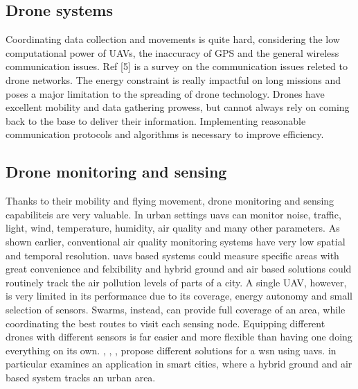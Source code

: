 \subsection{Drone systems}
Coordinating data collection and movements is quite hard, considering the low computational power of UAVs, the inaccuracy of GPS and the general wireless communication issues. Ref [5] is a survey on the communication issues releted to drone networks. The energy constraint is really impactful on long missions and poses a major limitation to the spreading of drone technology. Drones have excellent mobility and data gathering prowess, but cannot always rely on coming back to the base to deliver their information. Implementing reasonable communication protocols and algorithms is necessary to improve efficiency. 
\subsection{Drone monitoring and sensing}
Thanks to their mobility and flying movement, drone monitoring and sensing capabiliteis are very valuable. In urban settings \gls{uavs} can monitor noise, traffic, light, wind, temperature, humidity, air quality and many other parameters.
As shown earlier, conventional air quality monitoring systems have very low spatial and temporal resolution. \gls{uavs} based systems could measure specific areas with great convenience and felxibility and hybrid ground and air based solutions could routinely track the air pollution levels of parts of a city. A single UAV, however, is very limited in its performance due to its coverage, energy autonomy and small selection of sensors.  Swarms, instead, can provide full coverage of an area, while coordinating the best routes to visit each sensing node. Equipping different drones with different sensors is far easier and more flexible than having one doing everything on its own.
\cite{7946542}, \cite{evangelatos2015airborne}, \cite{8675167}, \cite{8662050} propose different solutions for a \gls{wsn} using \gls{uavs}. \cite{8675167} in particular examines an application in smart cities, where a hybrid ground and air based system tracks an urban area.
